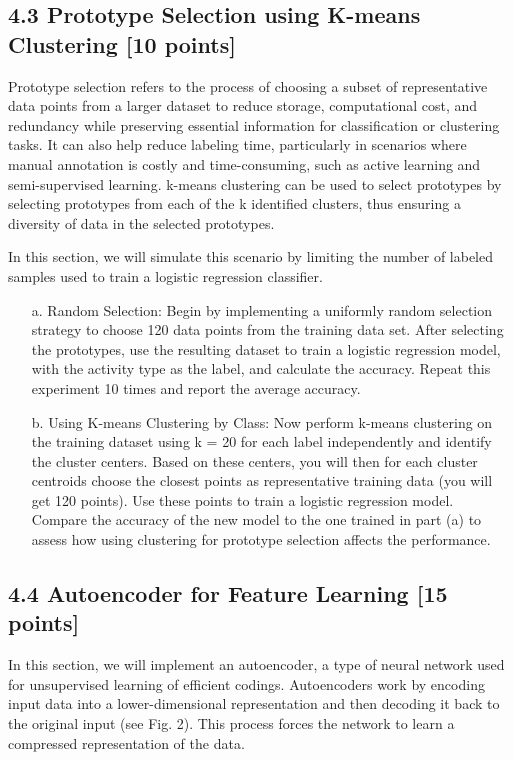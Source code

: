 \documentclass[a3paper,12pt]{extarticle} %
\begin{document}
\begin{enumerate}
\subsection*{4.3 Prototype Selection using K-means Clustering [10 points]}
Prototype selection refers to the process of choosing a subset of representative data points from a larger dataset to reduce storage, computational cost, and redundancy while preserving essential information for classification or clustering tasks. It can also help reduce labeling time, particularly in scenarios where manual annotation is costly and time-consuming, such as active learning and semi-supervised learning. k-means clustering can be used to select prototypes by selecting prototypes from each of the k identified clusters, thus ensuring a diversity of data in the selected prototypes.

In this section, we will simulate this scenario by limiting the number of labeled samples used to train a logistic regression classifier.

\begin{itemize}
\item[a.] Random Selection: Begin by implementing a uniformly random selection strategy to choose 120 data points from the training data set. After selecting the prototypes, use the resulting dataset to train a logistic regression model, with the activity type as the label, and calculate the accuracy. Repeat this experiment 10 times and report the average accuracy.

\item[b.] Using K-means Clustering by Class: Now perform k-means clustering on the training dataset using k = 20 for each label independently and identify the cluster centers. Based on these centers, you will then for each cluster centroids choose the closest points as representative training data (you will get 120 points). Use these points to train a logistic regression model. Compare the accuracy of the new model to the one trained in part (a) to assess how using clustering for prototype selection affects the performance.
\end{itemize}

\subsection*{4.4 Autoencoder for Feature Learning [15 points]}
In this section, we will implement an autoencoder, a type of neural network used for unsupervised learning of efficient codings. Autoencoders work by encoding input data into a lower-dimensional representation and then decoding it back to the original input (see Fig. 2). This process forces the network to learn a compressed representation of the data.


\end{enumerate}
\end{document}
